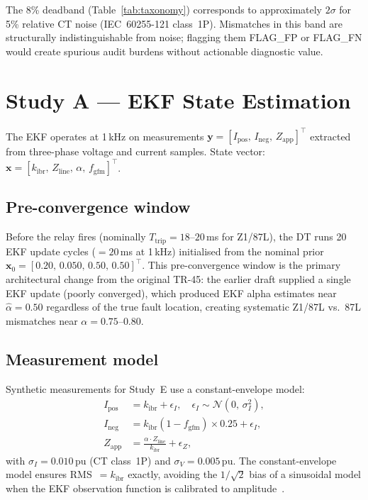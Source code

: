 \documentclass[11pt,a4paper]{article}
\newcommand{\kibr}{k_\mathrm{ibr}}
\begin{document}
The 8\% deadband (Table~\ref{tab:taxonomy}) corresponds to approximately
$2\sigma$ for 5\% relative CT noise (IEC~60255-121 class~1P).  Mismatches in
this band are structurally indistinguishable from noise; flagging them FLAG\_FP
or FLAG\_FN would create spurious audit burdens without actionable diagnostic
value.

\section{Study A --- EKF State Estimation}
\label{sec:studyA}

The EKF operates at 1\,kHz on measurements
$\mathbf{y} = [I_\mathrm{pos},\, I_\mathrm{neg},\, Z_\mathrm{app}]^\top$
extracted from three-phase voltage and current samples.  State vector:
$\mathbf{x} = [\kibr,\, Z_\mathrm{line},\, \alpha,\, f_\mathrm{gfm}]^\top$.

\subsection{Pre-convergence window}

Before the relay fires (nominally $T_\mathrm{trip} = 18$--$20$\,ms for Z1/87L),
the DT runs 20 EKF update cycles ($= 20$\,ms at 1\,kHz) initialised from the
nominal prior $\mathbf{x}_0 = [0.20,\, 0.050,\, 0.50,\, 0.50]^\top$.
This pre-convergence window is the primary architectural change from the
original TR-45: the earlier draft supplied a single EKF update (poorly
converged), which produced EKF alpha estimates near $\hat{\alpha} = 0.50$
regardless of the true fault location, creating systematic Z1/87L
vs.\ 87L mismatches near $\alpha = 0.75$--$0.80$.

\subsection{Measurement model}
\label{sec:meas}

Synthetic measurements for Study~E use a constant-envelope model:
\begin{align}
  I_\mathrm{pos} &= \kibr + \epsilon_I, \quad \epsilon_I \sim \mathcal{N}(0,\, \sigma_I^2), \\
  I_\mathrm{neg} &= \kibr(1-f_\mathrm{gfm})\times 0.25 + \epsilon_I, \\
  Z_\mathrm{app} &= \frac{\alpha \cdot Z_\mathrm{line}}{\kibr} + \epsilon_Z,
\end{align}
with $\sigma_I = 0.010$\,pu (CT class~1P) and $\sigma_V = 0.005$\,pu.
The constant-envelope model ensures RMS~$= \kibr$ exactly, avoiding the
$1/\sqrt{2}$ bias of a sinusoidal model when the EKF observation function is
calibrated to amplitude~\cite{SAMBP_TR44}.
\end{document}
